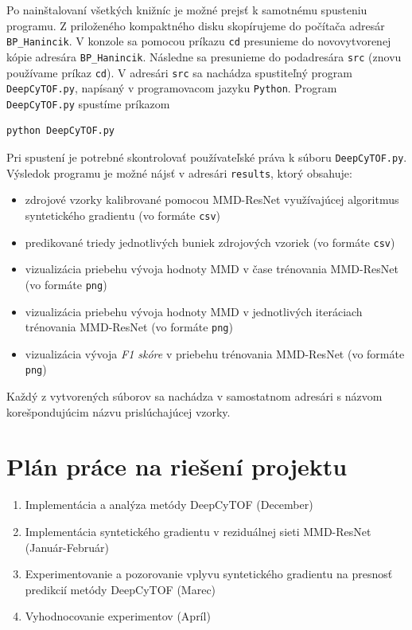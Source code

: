 Po nainštalovaní všetkých knižníc je možné prejsť k samotnému spusteniu programu. Z priloženého kompaktného disku skopírujeme do počítača adresár \texttt{BP_Hanincik}. V konzole sa pomocou príkazu \texttt{cd} presunieme do novovytvorenej kópie adresára \texttt{BP_Hanincik}. Následne sa presunieme do podadresára \texttt{src} (znovu používame príkaz \texttt{cd}). V adresári \texttt{src} sa nachádza spustiteľný program \texttt{DeepCyTOF.py}, napísaný v programovacom jazyku \texttt{Python}. Program \texttt{DeepCyTOF.py} spustíme príkazom 

\begin{Verbatim}[breaklines=true, breakanywhere=true]
python DeepCyTOF.py
\end{Verbatim}

Pri spustení je potrebné skontrolovať používateľské práva k súboru \texttt{DeepCyTOF.py}. Výsledok programu je možné nájsť v adresári \texttt{results}, ktorý obsahuje:

\begin{itemize}
    \item zdrojové vzorky kalibrované pomocou MMD-ResNet využívajúcej algoritmus syntetického gradientu (vo formáte \texttt{csv})
    \item predikované triedy jednotlivých buniek zdrojových vzoriek (vo formáte \texttt{csv})
    \item vizualizácia priebehu vývoja hodnoty MMD v čase trénovania MMD-ResNet (vo formáte \texttt{png})
    \item vizualizácia priebehu vývoja hodnoty MMD v jednotlivých iteráciach trénovania MMD-ResNet (vo formáte \texttt{png})
    \item vizualizácia vývoja \textit{F1 skóre} v priebehu trénovania MMD-ResNet (vo formáte \texttt{png})
\end{itemize}

Každý z vytvorených súborov sa nachádza v samostatnom adresári s názvom korešpondujúcim názvu prislúchajúcej vzorky.

\chapter{Plán práce na riešení projektu}
\begin{enumerate}
    \item Implementácia a analýza metódy DeepCyTOF (December)
    \item Implementácia syntetického gradientu v reziduálnej sieti MMD-ResNet (Január-Február)
    \item Experimentovanie a pozorovanie vplyvu syntetického gradientu na presnosť predikcií metódy DeepCyTOF (Marec)
    \item Vyhodnocovanie experimentov (Apríl)
\end{enumerate}

